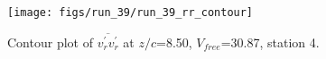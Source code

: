 \begin{figure}[H]
\centering
\texttt{[image: figs/run\_39/run\_39\_rr\_contour]}
\caption{Contour plot of $\overline{v_{r}^{\prime} v_{r}^{\prime}}$ at $z/c$=8.50, $V_{free}$=30.87, station 4.}
\label{fig:run_39_rr_contour}
\end{figure}


